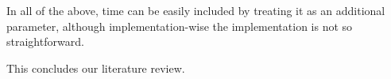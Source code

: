 \documentclass[literature_review.tex]{subfiles}
\begin{document}
In all of the above, 
time can be easily included by treating it as an additional parameter,
although implementation-wise the implementation is not so straightforward. 

This concludes our literature review.





\end{document}
